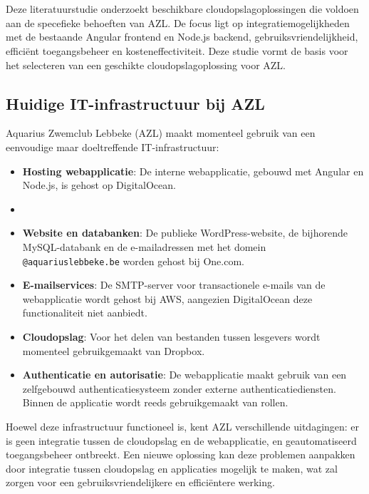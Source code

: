 \chapter{}%
\label{ch:stand-van-zaken}



Deze literatuurstudie onderzoekt beschikbare cloudopslagoplossingen die voldoen aan de specefieke behoeften van AZL. 
De focus ligt op integratiemogelijkheden met de bestaande Angular frontend en Node.js backend, gebruiksvriendelijkheid, efficiënt toegangsbeheer en kosteneffectiviteit. 
Deze studie vormt de basis voor het selecteren van een geschikte cloudopslagoplossing voor AZL.

\section{Huidige IT-infrastructuur bij AZL}
Aquarius Zwemclub Lebbeke (AZL) maakt momenteel gebruik van een eenvoudige maar doeltreffende IT-infrastructuur:
\begin{itemize}
    \item \textbf{Hosting webapplicatie}: De interne webapplicatie, gebouwd met Angular en Node.js, is gehost op DigitalOcean.
    \item \item \textbf{Website en databanken}: De publieke WordPress-website, de bijhorende MySQL-databank en de e-mailadressen met het domein \texttt{@aquariuslebbeke.be} worden gehost bij One.com.
    \item \textbf{E-mailservices}: De SMTP-server voor transactionele e-mails van de webapplicatie wordt gehost bij AWS, aangezien DigitalOcean deze functionaliteit niet aanbiedt.
    \item \textbf{Cloudopslag}: Voor het delen van bestanden tussen lesgevers wordt momenteel gebruikgemaakt van Dropbox.
    \item \textbf{Authenticatie en autorisatie}: De webapplicatie maakt gebruik van een zelfgebouwd authenticatiesysteem zonder externe authenticatiediensten. Binnen de applicatie wordt reeds gebruikgemaakt van rollen.
\end{itemize}
Hoewel deze infrastructuur functioneel is, kent AZL verschillende uitdagingen: er is geen integratie tussen de cloudopslag en de webapplicatie, en geautomatiseerd toegangsbeheer ontbreekt. Een nieuwe oplossing kan deze problemen aanpakken door integratie tussen cloudopslag en applicaties mogelijk te maken, wat zal zorgen voor een gebruiksvriendelijkere en efficiëntere werking.

